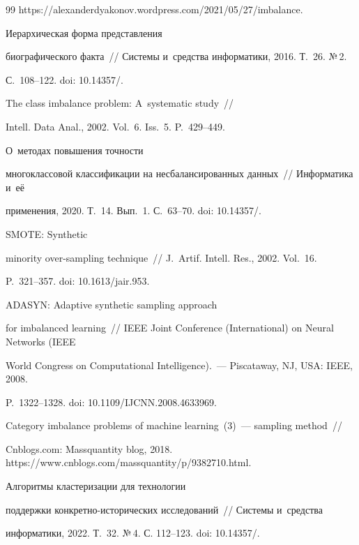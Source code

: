 {{\begin{thebibliography}{99}
{https://\linebreak alexanderdyakonov.wordpress.com/2021/05/27/imbalance}.




   Иерархическая форма представления 


биографического факта~/\!\!/ Системы и~средства информатики, 2016. Т.~26. №\,2.  


С.~108--122. doi: 10.14357\!/.




   The class imbalance problem: A~systematic study~/\!\!/ 


Intell. Data Anal., 2002. Vol.~6. Iss.~5. P.~429--449. 




   О~методах повышения точ\-ности 


многоклассовой классификации на несбалансированных данных~/\!\!/ Информатика и~её 


применения, 2020. Т.~14. Вып.~1. С.~63--70. doi: 10.14357\!/.




   SMOTE: Synthetic 


minority over-sampling technique~/\!\!/ J.~Artif. Intell. Res., 2002. Vol.~16.  


P.~321--357. doi: 10.1613\!/\!jair.953.


  




   ADASYN: Adaptive synthetic sampling approach 


for imbalanced learning~/\!\!/ IEEE Joint Conference (International) on Neural Networks (IEEE 


World Congress on Computational Intelligence).~--- Piscataway, NJ, USA: IEEE, 2008. 


P.~1322--1328. doi: 10.1109\!/\!IJCNN.2008.4633969.




  Category imbalance problems of machine learning~(3)~--- sampling method~/\!\!/ 


Cnblogs.com: Massquantity blog, 2018. {\sf https://www.cnblogs.com/massquantity/\linebreak p/9382710.html}.




   Алгоритмы кластеризации для технологии 


поддержки кон\-крет\-но-ис\-то\-ри\-че\-ских исследований~/\!\!/ Системы и~средства 


информатики, 2022. Т.~32. №\,4. С. 112--123. doi: 10.14357\!/.





   \end{thebibliography}


} }
